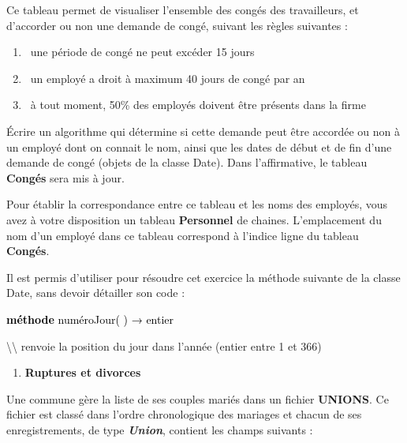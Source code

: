{
Ce tableau permet de visualiser l’ensemble des congés des travailleurs,
et d’accorder ou non une demande de congé, suivant les règles suivantes
:}

\liststyleWWviiiNumiv
\begin{enumerate}
\item {
\ une période de congé ne peut excéder 15 jours}
\item {
\ un employé a droit à maximum 40 jours de congé par an}
\item {
\ à tout moment, 50\% des employés doivent être présents dans la firme}
\end{enumerate}
{
Écrire un algorithme qui détermine si cette demande peut être accordée
ou non à un employé dont on connait le nom, ainsi que les dates de
début et de fin d’une demande de congé (objets de la classe Date). Dans
l’affirmative, le tableau \textbf{Congés} sera mis à jour.}

{
Pour établir la correspondance entre ce tableau et les noms des
employés, vous avez à votre disposition un tableau \textbf{Personnel}
de chaines. L’emplacement du nom d’un employé dans ce tableau
correspond à l’indice ligne du tableau \textbf{Congés}.}

{
Il est permis d’utiliser pour résoudre cet exercice la méthode suivante
de la classe Date, sans devoir détailler son code :}

{\sffamily
\textbf{\textcolor{black}{méthode}}\textcolor{black}{ numéroJour( )
}\textcolor{black}{→}\textcolor{black}{ entier}}

{\sffamily
{\textbackslash}{\textbackslash} renvoie la position du jour dans
l’année (entier entre 1 et 366)}


\bigskip

\liststyleExercice
\begin{enumerate}
\item {\sffamily\bfseries
Ruptures et divorces}
\end{enumerate}

\bigskip

{
{Une commune gère la liste de ses couples mariés
dans un fichier
}{\textbf{UNIONS}}{. Ce
fichier est classé dans l’ordre chronologique des mariages et chacun de
ses enregistrements, de type
}{\textbf{\textit{Union}}}{,
contient les champs suivants :}}

